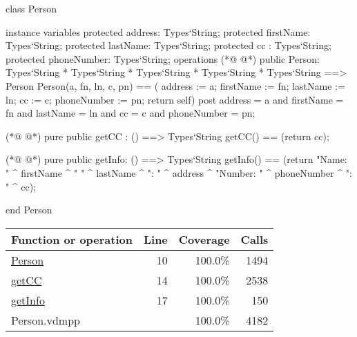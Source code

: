 \begin{vdmpp}[breaklines=true]
class Person

instance variables
  protected address: Types`String;
  protected firstName: Types`String;
  protected lastName: Types`String;
  protected cc : Types`String;
  protected phoneNumber: Types`String;
operations
(*@
\label{Person:10}
@*)
 public Person: Types`String * Types`String * Types`String * Types`String * Types`String ==> Person
  Person(a, fn, ln, c, pn) == ( address := a; firstName := fn; lastName := ln; cc := c; phoneNumber := pn; return self)
 post address = a and firstName = fn and lastName = ln and cc = c and phoneNumber = pn;
  
(*@
\label{getCC:14}
@*)
 pure public getCC : () ==> Types`String
  getCC() == (return cc);
  
(*@
\label{getInfo:17}
@*)
 pure public getInfo: () ==> Types`String
  getInfo() == (return "Name: " ^ firstName ^ " " ^ lastName ^ "\nAddress: " ^ address ^ "\nPhone Number: " ^ phoneNumber ^ "\nCC: " ^ cc);

end Person
\end{vdmpp}
\bigskip
\begin{longtable}{|l|r|r|r|}
\hline
Function or operation & Line & Coverage & Calls \\
\hline
\hline
\hyperref[Person:10]{Person} & 10&100.0\% & 1494 \\
\hline
\hyperref[getCC:14]{getCC} & 14&100.0\% & 2538 \\
\hline
\hyperref[getInfo:17]{getInfo} & 17&100.0\% & 150 \\
\hline
\hline
Person.vdmpp & & 100.0\% & 4182 \\
\hline
\end{longtable}

